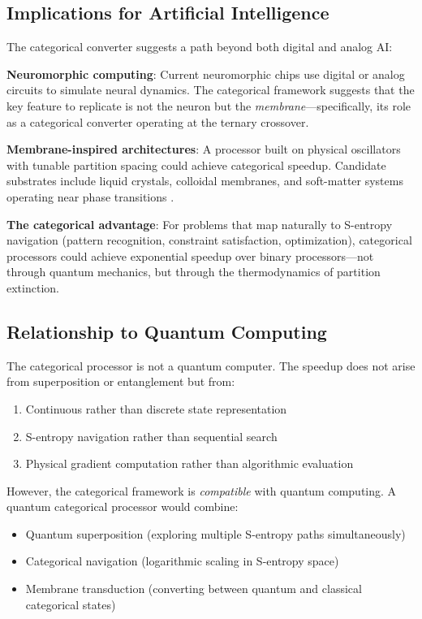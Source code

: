 \documentclass[twocolumn,10pt]{article}
\theoremstyle{remark}
\begin{document}
\subsection{Implications for Artificial Intelligence}

The categorical converter suggests a path beyond both digital and analog AI:

\textbf{Neuromorphic computing}: Current neuromorphic chips use digital or analog circuits to simulate neural dynamics. The categorical framework suggests that the key feature to replicate is not the neuron but the \emph{membrane}---specifically, its role as a categorical converter operating at the ternary crossover.

\textbf{Membrane-inspired architectures}: A processor built on physical oscillators with tunable partition spacing could achieve categorical speedup. Candidate substrates include liquid crystals, colloidal membranes, and soft-matter systems operating near phase transitions \cite{whitesides2002}.

\textbf{The categorical advantage}: For problems that map naturally to S-entropy navigation (pattern recognition, constraint satisfaction, optimization), categorical processors could achieve exponential speedup over binary processors---not through quantum mechanics, but through the thermodynamics of partition extinction.

\subsection{Relationship to Quantum Computing}

The categorical processor is not a quantum computer. The speedup does not arise from superposition or entanglement but from:
\begin{enumerate}
    \item Continuous rather than discrete state representation
    \item S-entropy navigation rather than sequential search
    \item Physical gradient computation rather than algorithmic evaluation
\end{enumerate}

However, the categorical framework is \emph{compatible} with quantum computing. A quantum categorical processor would combine:
\begin{itemize}
    \item Quantum superposition (exploring multiple S-entropy paths simultaneously)
    \item Categorical navigation (logarithmic scaling in S-entropy space)
    \item Membrane transduction (converting between quantum and classical categorical states)
\end{itemize}
\end{document}
